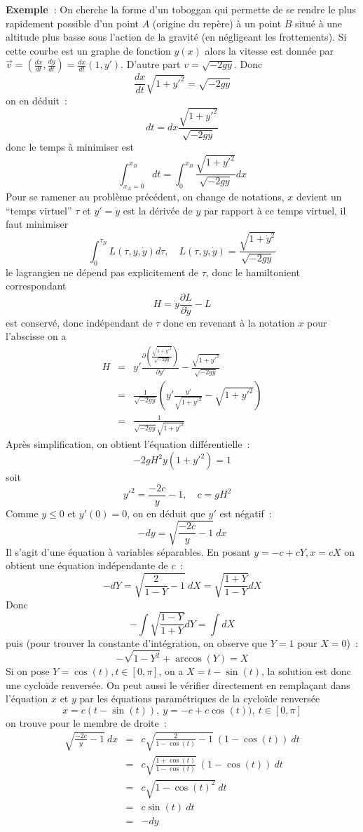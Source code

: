 \documentclass[a4paper,11pt]{article}
\begin{document}
{\bf Exemple~}: On cherche la forme d'un toboggan qui permette
de se rendre le plus rapidement possible d'un point $A$ (origine
du rep\`ere) \`a un point $B$ situ\'e \`a une altitude plus basse 
sous l'action de la gravit\'e (en n\'egligeant les frottements). 
Si cette courbe est un graphe de fonction $y(x)$ alors la vitesse
est donn\'ee par 
$\overrightarrow{v}=(\frac{dx}{dt},\frac{dy}{dt})=\frac{dx}{dt}(1,y')$.
D'autre part $v=\sqrt{-2gy}$. Donc
$$ \frac{dx}{dt}\sqrt{1+y'^2}=\sqrt{-2gy}$$
on en d\'eduit~:
$$ dt = dx \frac{\sqrt{1+y'^2}}{\sqrt{-2gy}}$$
donc le temps \`a minimiser est
$$ \int_{x_A=0}^{x_B} dt = \int_0^{x_B}
\frac{\sqrt{1+y'^2}}{\sqrt{-2gy}} dx$$
Pour se ramener au probl\`eme pr\'ec\'edent, 
on change de notations, $x$ devient un ``temps virtuel''
$\tau$ et $y'=\dot{y}$ est la d\'eriv\'ee de $y$ par
rapport \`a ce temps virtuel, il faut minimiser
$$ \int_0^{\tau_B} L(\tau,y,\dot{y}) d\tau, \quad 
L(\tau,y,\dot{y})=\frac{\sqrt{1+\dot{y}^2}}{\sqrt{-2gy}} $$
le lagrangien ne d\'epend pas explicitement de $\tau$, donc le
hamiltonient correspondant
$$ H=\dot{y} \frac{\partial L}{\partial\dot{y}}  - L $$
est conserv\'e, donc ind\'ependant de $\tau$ donc en revenant
\`a la notation $x$ pour l'abscisse on a
\begin{eqnarray*}
 H&=&y'  \frac{ \partial{ \left( \frac{\sqrt{1+y'^2}}{\sqrt{-2gy}}
    \right)} }{\partial y'}- 
\frac{\sqrt{1+y'^2}}{\sqrt{-2gy}}\\
&=& \frac1 {\sqrt{-2gy}} \left( y' \frac{y'}{\sqrt{1+y'^2}} -
  \sqrt{1+y'^2} \right)\\
&=&\frac1 {\sqrt{-2gy} \sqrt{1+y'^2}} 
\end{eqnarray*}
Apr\`es simplification, on obtient l'\'equation diff\'erentielle~:
$$ -2gH^2y (1+y'^2) = 1$$
soit 
$$ y'^2=\frac{-2c}{y}-1, \quad c=gH^2\quad $$
Comme $y\leq 0$ et $y'(0)=0$, on en d\'eduit que $y'$ est n\'egatif~:
$$ -dy = \sqrt{\frac{-2c}{y}-1} \ dx$$
Il s'agit d'une \'equation \`a variables s\'eparables. En posant
$y=-c+cY, x=cX$
on obtient une \'equation ind\'ependante de $c$~:
$$ -dY=\sqrt{\frac{2}{1-Y}-1} \ dX=\sqrt{\frac{1+Y}{1-Y}} dX$$
Donc
$$ -\int \sqrt{\frac{1-Y}{1+Y}} dY = \int dX $$
puis (pour trouver la constante d'int\'egration, on observe que
$Y=1$ pour $X=0$)~:
$$ -\sqrt{1-Y^2}+\arccos(Y)=X$$
Si on pose $Y=\cos(t), t \in [0,\pi]$, on a $X=t - \sin(t)$,
la solution est donc une cyclo\"ide renvers\'ee.
On peut aussi le v\'erifier directement
en rempla\c{c}ant dans l'\'equation $x$ et $y$
par les \'equations param\'etriques de la cyclo\"ide renvers\'ee
$$x=c(t-\sin(t)), \ y=-c+c\cos(t)), \ t \in [0,\pi]$$
on trouve pour le membre de droite~:
\begin{eqnarray*}
\sqrt{\frac{-2c}{y}-1} \ dx &=& c \sqrt{\frac{2}{1-\cos(t)}-1} \
(1-\cos(t)) \ dt\\
&=& c \sqrt{\frac{1+\cos(t)}{1-\cos(t)}} \  (1-\cos(t)) \ dt \\
&=& c \sqrt{1-\cos(t)^2} \ dt\\
&=& c \sin(t) \ dt \\
&=& -dy
\end{eqnarray*}
\end{document}
